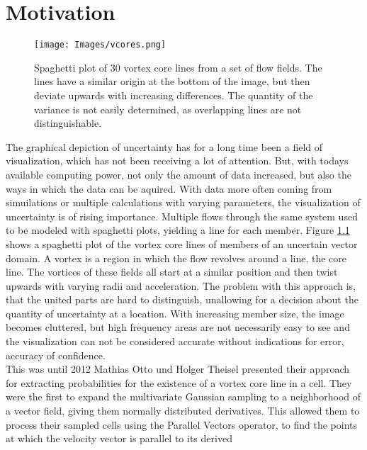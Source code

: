 \chapter{Motivation}

\begin{figure}[ht]
    \centering
    \texttt{[image: Images/vcores.png]}
    \caption{Spaghetti plot of 30 vortex core lines from a set of flow
    fields. The lines have a similar origin at the bottom of the image,
    but then deviate upwards with increasing differences. The quantity
    of the variance is not easily determined, as overlapping lines are
    not distinguishable.}
    \label{fig:spaghetti}
\end{figure}
The graphical depiction of uncertainty has for a long time been a field
of visualization, which has not been receiving a lot of attention. But,
with todays available computing power, not only the amount of data
increased, but also the ways in which the data can be aquired. With data
more often coming from simuilations or multiple calculations with
varying parameters, the visualization of uncertainty is of rising
importance. Multiple flows through the same system used to be modeled
with spaghetti plots, yielding a line for each member. Figure
\ref{fig:spaghetti} shows a spaghetti plot of the vortex core lines of
members of an uncertain vector domain. A vortex is a region in which the
flow revolves around a line, the core line. The vortices of these fields
all start at a similar position and then twist upwards with varying
radii and acceleration. The problem with this approach is, that the
united parts are hard to distinguish, unallowing for a decision about
the quantity of uncertainty at a location. With increasing member size,
the image becomes cluttered, but high frequency areas are not
necessarily easy to see and the visualization can not be considered
accurate without indications for error, accuracy of confidence.\\
\indent This was until 2012 Mathias Otto und Holger Theisel presented
their approach for extracting probabilities for the existence of a
vortex core line in a cell. They were the first to expand the
multivariate Gaussian sampling to a neighborhood of a vector field,
giving them normally distributed derivatives. This allowed them to
process their sampled cells using the Parallel Vectors operator, to find
the points at which the velocity vector is parallel to its derived
